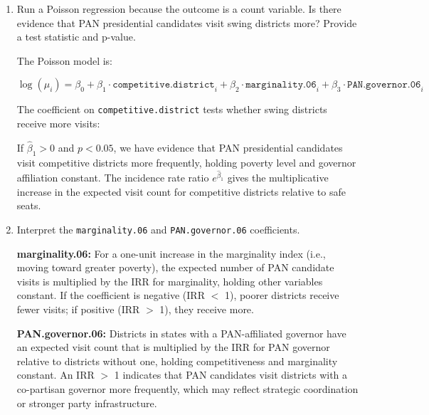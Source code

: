 \documentclass[12pt,letterpaper]{article}
\begin{document}
\begin{enumerate}
	\item [(a)]
	Run a Poisson regression because the outcome is a count variable. Is there evidence that PAN presidential candidates visit swing districts more? Provide a test statistic and p-value.

\vspace{.25cm}


\vspace{.5cm}


\vspace{.5cm}

The Poisson model is:

$$\log(\mu_i) = \beta_0 + \beta_1 \cdot \texttt{competitive.district}_i + \beta_2 \cdot \texttt{marginality.06}_i + \beta_3 \cdot \texttt{PAN.governor.06}_i$$

The coefficient on \texttt{competitive.district} tests whether swing districts receive more visits:


\vspace{.5cm}

If $\hat{\beta}_1 > 0$ and $p < 0.05$, we have evidence that PAN presidential candidates visit competitive districts more frequently, holding poverty level and governor affiliation constant. The incidence rate ratio $e^{\hat{\beta}_1}$ gives the multiplicative increase in the expected visit count for competitive districts relative to safe seats.

	\item [(b)]
	Interpret the \texttt{marginality.06} and \texttt{PAN.governor.06} coefficients.

\vspace{.25cm}


\vspace{.5cm}


\vspace{.5cm}

\textbf{marginality.06:} For a one-unit increase in the marginality index (i.e., moving toward greater poverty), the expected number of PAN candidate visits is multiplied by the IRR for marginality, holding other variables constant. If the coefficient is negative (IRR $<$ 1), poorer districts receive fewer visits; if positive (IRR $>$ 1), they receive more.

\textbf{PAN.governor.06:} Districts in states with a PAN-affiliated governor have an expected visit count that is multiplied by the IRR for PAN governor relative to districts without one, holding competitiveness and marginality constant. An IRR $>$ 1 indicates that PAN candidates visit districts with a co-partisan governor more frequently, which may reflect strategic coordination or stronger party infrastructure.


\end{enumerate}
\end{document}
